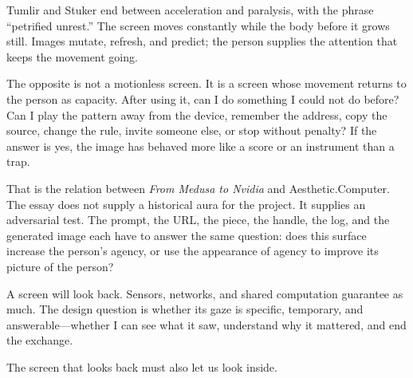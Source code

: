 \documentclass[11pt,letterpaper]{article}
\newcommand{\ac}{Aesthetic\textcolor{acpink}{.}Computer}
\begin{document}
Tumlir and Stuker end between acceleration and paralysis, with the phrase
``petrified unrest.'' The screen moves constantly while the body before it grows
still. Images mutate, refresh, and predict; the person supplies the attention
that keeps the movement going.

The opposite is not a motionless screen. It is a screen whose movement returns
to the person as capacity. After using it, can I do something I could not do
before? Can I play the pattern away from the device, remember the address, copy
the source, change the rule, invite someone else, or stop without penalty? If
the answer is yes, the image has behaved more like a score or an instrument than
a trap.

That is the relation between \textit{From Medusa to Nvidia} and \ac{}. The essay
does not supply a historical aura for the project. It supplies an adversarial
test. The prompt, the URL, the piece, the handle, the log, and the generated
image each have to answer the same question: does this surface increase the
person's agency, or use the appearance of agency to improve its picture of the
person?

A screen will look back. Sensors, networks, and shared computation guarantee as
much. The design question is whether its gaze is specific, temporary, and
answerable---whether I can see what it saw, understand why it mattered, and end
the exchange.

The screen that looks back must also let us look inside.

\end{document}
